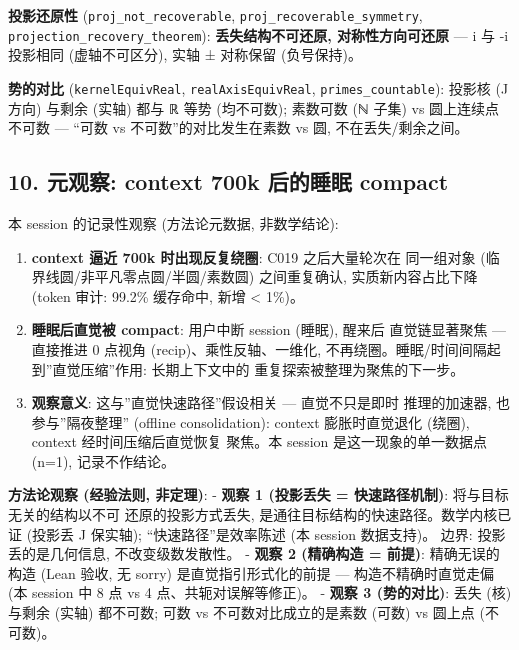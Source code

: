 \documentclass[
]{article}
\providecommand{\tightlist}{%
  \setlength{\itemsep}{0pt}\setlength{\parskip}{0pt}}
\begin{document}
\textbf{投影还原性} (\texttt{proj\_not\_recoverable},
\texttt{proj\_recoverable\_symmetry},
\texttt{projection\_recovery\_theorem}): \textbf{丢失结构不可还原,
对称性方向可还原} --- i 与 -i 投影相同 (虚轴不可区分), 实轴 ± 对称保留
(负号保持)。

\textbf{势的对比} (\texttt{kernelEquivReal}, \texttt{realAxisEquivReal},
\texttt{primes\_countable}): 投影核 (J 方向) 与剩余 (实轴) 都与 ℝ 等势
(均不可数); 素数可数 (ℕ 子集) vs 圆上连续点不可数 --- ``可数 vs
不可数''的对比发生在素数 vs 圆, 不在丢失/剩余之间。

\subsection{10. 元观察: context 700k 后的睡眠
compact}\label{ux5143ux89c2ux5bdf-context-700k-ux540eux7684ux7761ux7720-compact}

本 session 的记录性观察 (方法论元数据, 非数学结论):

\begin{enumerate}
\def\labelenumi{\arabic{enumi}.}
\tightlist
\item
  \textbf{context 逼近 700k 时出现反复绕圈}: C019 之后大量轮次在
  同一组对象 (临界线圆/非平凡零点圆/半圆/素数圆) 之间重复确认,
  实质新内容占比下降 (token 审计: 99.2\% 缓存命中, 新增 \textless{}
  1\%)。
\item
  \textbf{睡眠后直觉被 compact}: 用户中断 session (睡眠), 醒来后
  直觉链显著聚焦 --- 直接推进 0 点视角 (recip)、乘性反轴、一维化,
  不再绕圈。睡眠/时间间隔起到''直觉压缩''作用: 长期上下文中的
  重复探索被整理为聚焦的下一步。
\item
  \textbf{观察意义}: 这与''直觉快速路径''假设相关 --- 直觉不只是即时
  推理的加速器, 也参与''隔夜整理'' (offline consolidation): context
  膨胀时直觉退化 (绕圈), context 经时间压缩后直觉恢复 聚焦。本 session
  是这一现象的单一数据点 (n=1), 记录不作结论。
\end{enumerate}

\textbf{方法论观察 (经验法则, 非定理)}: - \textbf{观察 1 (投影丢失 =
快速路径机制)}: 将与目标无关的结构以不可 还原的投影方式丢失,
是通往目标结构的快速路径。数学内核已证 (投影丢 J 保实轴);
``快速路径''是效率陈述 (本 session 数据支持)。 边界: 投影丢的是几何信息,
不改变级数发散性。 - \textbf{观察 2 (精确构造 = 前提)}: 精确无误的构造
(Lean 验收, 无 sorry) 是直觉指引形式化的前提 --- 构造不精确时直觉走偏
(本 session 中 8 点 vs 4 点、共轭对误解等修正)。 - \textbf{观察 3
(势的对比)}: 丢失 (核) 与剩余 (实轴) 都不可数; 可数 vs
不可数对比成立的是素数 (可数) vs 圆上点 (不可数)。
\end{document}
